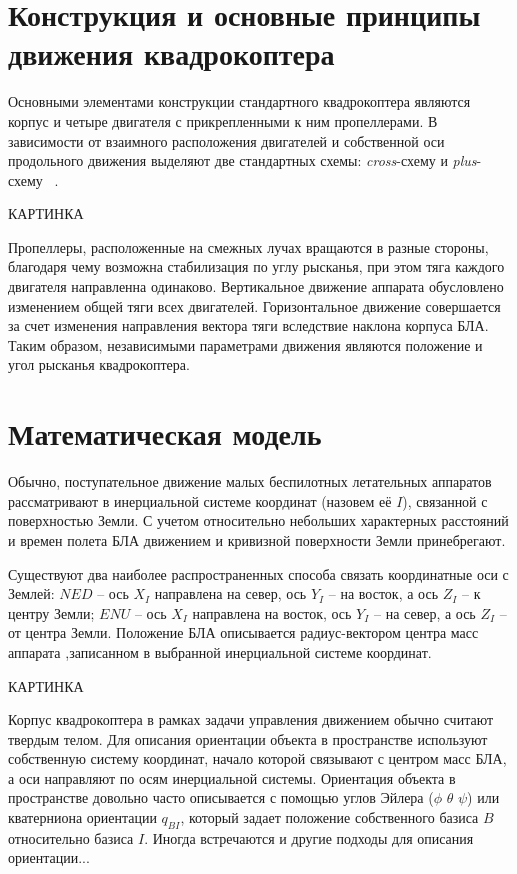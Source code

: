 \documentclass[a4paper,14pt,oneside,openany]{memoir}
\begin{document}
	\section{Конструкция и основные принципы движения квадрокоптера}
	
	Основными элементами конструкции стандартного квадрокоптера являются корпус и четыре двигателя с прикрепленными к ним пропеллерами. В зависимости от взаимного расположения двигателей и собственной оси продольного движения выделяют две стандартных схемы: \textit{cross}-схему и \textit{plus}-схему ~\cite{Bashi01}.
	
	
	КАРТИНКА
	
	Пропеллеры, расположенные на смежных лучах вращаются в разные стороны, благодаря чему возможна стабилизация по углу рысканья, при этом тяга каждого двигателя направленна одинаково. Вертикальное движение аппарата обусловлено изменением общей тяги всех двигателей. Горизонтальное движение совершается за счет изменения направления вектора тяги вследствие наклона корпуса БЛА. Таким образом, независимыми параметрами движения являются положение и угол рысканья квадрокоптера. 
	
	\section{Математическая модель}
		
	Обычно, поступательное движение малых беспилотных летательных аппаратов рассматривают в инерциальной системе координат (назовем её {$I$}), связанной с поверхностью Земли. С учетом относительно небольших характерных расстояний и времен полета БЛА движением и кривизной поверхности Земли принебрегают.
	
	Существуют два наиболее распространенных способа связать координатные оси с Землей: {$NED$} --  ось \textbf{$X_I$} направлена на север, ось \textbf{$Y_I$} -- на восток, а ось \textbf{$Z_I$} -- к центру Земли; {$ENU$} -- ось \textbf{$X_I$} направлена на восток, ось \textbf{$Y_I$} -- на север, а ось \textbf{$Z_I$} -- от центра Земли. Положение БЛА описывается радиус-вектором центра масс аппарата ,записанном в выбранной инерциальной системе координат.
	
	КАРТИНКА
	
	
	Корпус квадрокоптера в рамках задачи управления движением обычно считают твердым телом. Для описания ориентации объекта в пространстве используют собственную систему координат, начало которой связывают с центром масс БЛА, а оси направляют по осям инерциальной системы.
	Ориентация объекта в пространстве довольно часто описывается с помощью углов Эйлера {($\phi$ $\theta$ $\psi$)} или кватерниона ориентации {$q_{BI}$}, который задает положение собственного базиса {$B$} относительно базиса {$I$}. Иногда встречаются и другие подходы для описания ориентации...
	
\end{document}
